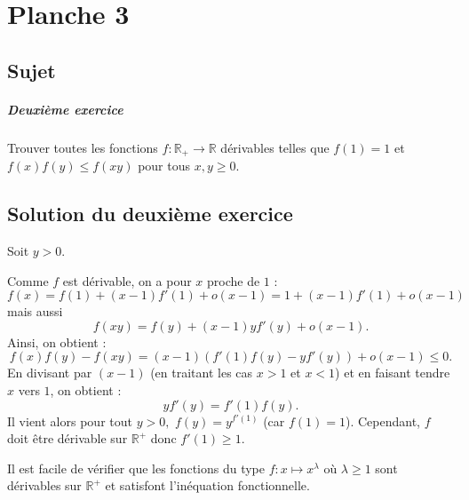 \chapter{Planche 3}

\section{Sujet}

\paragraph{Deuxième exercice}

Trouver toutes les fonctions $f : \mathbb R_+ \to \mathbb R$ dérivables telles que $f(1)=1$ et $f(x)f(y) \leq f(xy)$ pour tous $x,y \geqslant 0$.


\section{Solution du deuxième exercice}

Soit $y>0.$

Comme $f$ est dérivable, on a pour $x$ proche de $1$ : 
$$f(x)=f(1)+(x-1)f'(1)+o(x-1)=1+(x-1)f'(1)+o(x-1)$$ mais aussi $$ f(xy)=f(y)+(x-1)yf'(y)+o(x-1).$$
Ainsi, on obtient : $$f(x)f(y)-f(xy)=(x-1)\left( f'(1)f(y)-yf'(y) \right)+o(x-1)\leq 0.$$
En divisant par $(x-1)$ (en traitant les cas $x>1$ et $x<1$) et en faisant tendre $x$ vers $1$, on obtient : $$yf'(y)=f'(1)f(y).$$
Il vient alors pour tout $y>0,$ $\displaystyle f(y)=y^{f'(1)}$ (car $f(1)=1$).
Cependant, $f$ doit être dérivable sur $\mathbb{R}^{+}$ donc $f'(1)\geq 1.$

Il est facile de vérifier que les fonctions du type $ f: x\mapsto x^{\lambda}$ où $\lambda\geq 1$ sont dérivables sur $\mathbb{R}^{+}$ et satisfont l'inéquation fonctionnelle.
